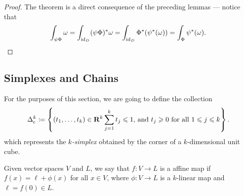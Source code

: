 \begin{proof}
    The theorem is a direct consequence of the preceding lemmas --- notice that
    \[
        \int_{\psi \Phi} \omega
        = \int_{\operatorname{id}_D} (\psi \Phi)^{*} \omega
        = \int_{\operatorname{id}_D} \Phi^{*}(\psi^{*}(\omega))
        = \int_{\Phi} \psi^{*}(\omega).
    \]
\end{proof}

\subsection{Simplexes and Chains}

\begin{notation}
    For the purposes of this section, we are going to define the collection
    \[
        \Delta_{\text{c}}^k \coloneq \left\{
        (t_{1}, \dots, t_k) \in \mathbf{R}^k \relax
        \sum_{j=1}^k t_j \leqslant 1 \text{, and }
        t_j \geqslant 0 \text{ for all } 1 \leqslant j \leqslant k
        \right\}.
    \]
    which represents the \emph{\(k\)-simplex} obtained by the corner of a
    \(k\)-dimensional unit cube.
\end{notation}

\begin{definition}
    \label{def:affine-map}
    Given vector spaces \(V\) and \(L\), we say that \(f: V \to L\) is a affine map
    if \(f(x) = \ell + \phi(x)\) for all \(x \in V\), where \(\phi: V \to L\) is a
    \(k\)-linear map and \(\ell = f(0) \in L\).
\end{definition}

